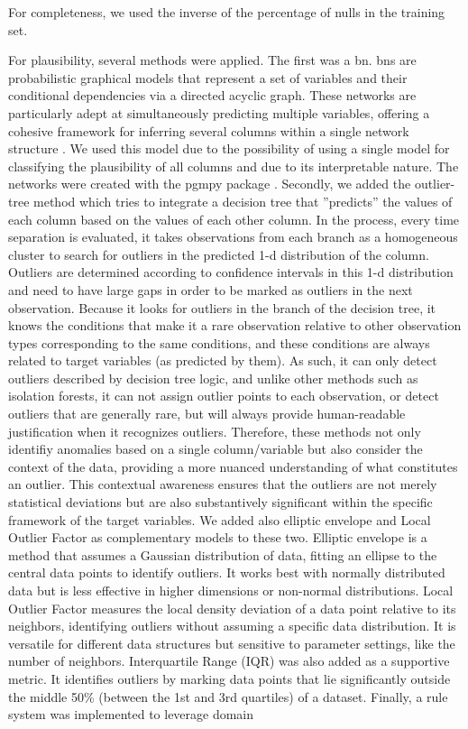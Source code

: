 
For completeness, we used the inverse of the percentage of nulls in the training set. 

For plausibility, several methods were applied. The first was a \ac{bn}. \acp{bn} are probabilistic graphical models that represent a set of variables and their conditional dependencies via a directed acyclic graph. These networks are particularly adept at simultaneously predicting multiple variables, offering a cohesive framework for inferring several columns within a single network structure \cite{pearl1988probabilistic}.
We used this model due to the possibility of using a single model for classifying the plausibility of all columns and due to its interpretable nature. The networks were created with the pgmpy package \cite{pgmpy}. Secondly, we added the outlier-tree method \cite{cortesExplainableOutlierDetection2020} which tries to integrate a decision tree that ”predicts” the values of each column based on the values of each other column. In the process, every time separation is evaluated, it takes observations from each branch as a homogeneous cluster to search for outliers in the predicted 1-d distribution of the column. Outliers are determined according to confidence intervals in this 1-d distribution and need to have large gaps in order to be marked as outliers in the next observation. Because it looks for outliers in the branch of the decision tree, it knows the conditions that make it a rare observation relative to other observation types corresponding to the same conditions, and these conditions are always related to target variables (as predicted by them).  As such, it can only detect outliers described by decision tree logic, and unlike other methods such as isolation forests, it can not assign outlier points to each observation, or detect outliers that are generally rare, but will always provide human-readable justification when it recognizes outliers. Therefore, these methods not only identifiy anomalies based on a single column/variable but also consider the context of the data, providing a more nuanced understanding of what constitutes an outlier. This contextual awareness ensures that the outliers are not merely statistical deviations but are also substantively significant within the specific framework of the target variables. We added also elliptic envelope and Local Outlier Factor as complementary models to these two. Elliptic envelope is a method that assumes a Gaussian distribution of data, fitting an ellipse to the central data points to identify outliers. It works best with normally distributed data but is less effective in higher dimensions or non-normal distributions. Local Outlier Factor measures the local density deviation of a data point relative to its neighbors, identifying outliers without assuming a specific data distribution. It is versatile for different data structures but sensitive to parameter settings, like the number of neighbors. Interquartile Range (IQR) was also added as a supportive metric. It identifies outliers by marking data points that lie significantly outside the middle 50\% (between the 1st and 3rd quartiles) of a dataset. Finally, a rule system was implemented to leverage domain 